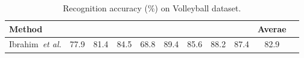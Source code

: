 \documentclass[9pt,journal,letterpaper,twocolumn]{IEEEtran}
\begin{document}
{\begin{figure}[!t]
	\end{figure}	

\begin{table}[!t]
	\centering
	\caption{{ Recognition accuracy (\%) on Volleyball dataset.}}
	\vspace{-1mm}
	{\scriptsize
		\label{volleyball}
		\begin{tabular}{lcccccccccc}
			\hline
\hspace{-0.5em}Method\hspace{-0.5em} & \hspace{-0.5em}{lpass}\hspace{-0.5em} & \hspace{-0.5em}{rpass}\hspace{-0.5em} & \hspace{-0.5em}{ lset}\hspace{-0.5em} & \hspace{-0.5em}{ rset}\hspace{-0.5em} & \hspace{-0.5em}{ lspike}\hspace{-0.5em} & \hspace{-0.5em}{ rspike}\hspace{-0.5em} & \hspace{-0.5em}{lwin}\hspace{-0.5em} & \hspace{-0.5em}{rwin}\hspace{-0.5em} &  \hspace{-0.5em}Averae\hspace{-0.7em}\\
			\hline
			\hspace{-0.5em}Ibrahim~\!\em{et al.}\cite{ibrahim2015hierarchical}\hspace{-0.5em} & \hspace{-0.5em}77.9\hspace{-0.5em}          & \hspace{-0.5em}81.4\hspace{-0.5em}          & \hspace{-0.5em}84.5\hspace{-0.5em}          & \hspace{-0.5em}68.8\hspace{-0.5em}          & \hspace{-0.5em}89.4\hspace{-0.5em}          & \hspace{-0.5em}85.6\hspace{-0.5em}          & \hspace{-0.5em}88.2\hspace{-0.5em}          & \hspace{-0.5em}87.4\hspace{-0.5em}            & \hspace{-0.5em}82.9\hspace{-0.5em} \\

\end{tabular}}
\end{table}}
\end{document}
